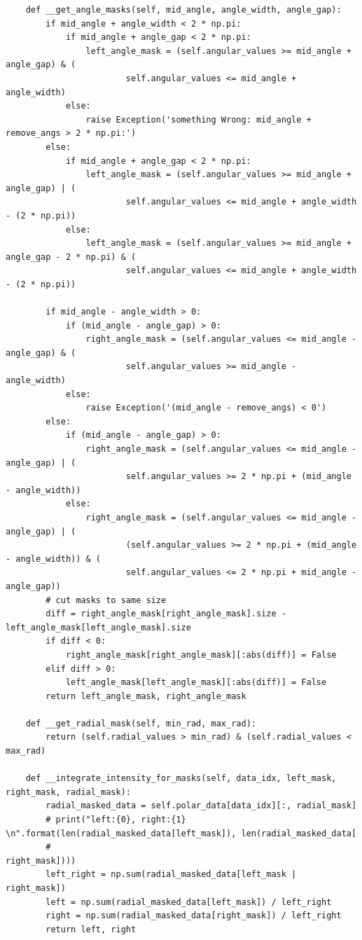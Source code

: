 \documentclass[a4paper, titlepage,  ngerman]{book}
\begin{document}
\begin{verbatim}
    def __get_angle_masks(self, mid_angle, angle_width, angle_gap):
        if mid_angle + angle_width < 2 * np.pi:
            if mid_angle + angle_gap < 2 * np.pi:
                left_angle_mask = (self.angular_values >= mid_angle + angle_gap) & (
                        self.angular_values <= mid_angle + angle_width)
            else:
                raise Exception('something Wrong: mid_angle + remove_angs > 2 * np.pi:')
        else:
            if mid_angle + angle_gap < 2 * np.pi:
                left_angle_mask = (self.angular_values >= mid_angle + angle_gap) | (
                        self.angular_values <= mid_angle + angle_width - (2 * np.pi))
            else:
                left_angle_mask = (self.angular_values >= mid_angle + angle_gap - 2 * np.pi) & (
                        self.angular_values <= mid_angle + angle_width - (2 * np.pi))

        if mid_angle - angle_width > 0:
            if (mid_angle - angle_gap) > 0:
                right_angle_mask = (self.angular_values <= mid_angle - angle_gap) & (
                        self.angular_values >= mid_angle - angle_width)
            else:
                raise Exception('(mid_angle - remove_angs) < 0')
        else:
            if (mid_angle - angle_gap) > 0:
                right_angle_mask = (self.angular_values <= mid_angle - angle_gap) | (
                        self.angular_values >= 2 * np.pi + (mid_angle - angle_width))
            else:
                right_angle_mask = (self.angular_values <= mid_angle - angle_gap) | (
                        (self.angular_values >= 2 * np.pi + (mid_angle - angle_width)) & (
                        self.angular_values <= 2 * np.pi + mid_angle - angle_gap))
        # cut masks to same size
        diff = right_angle_mask[right_angle_mask].size - left_angle_mask[left_angle_mask].size
        if diff < 0:
            right_angle_mask[right_angle_mask][:abs(diff)] = False
        elif diff > 0:
            left_angle_mask[left_angle_mask][:abs(diff)] = False
        return left_angle_mask, right_angle_mask

    def __get_radial_mask(self, min_rad, max_rad):
        return (self.radial_values > min_rad) & (self.radial_values < max_rad)

    def __integrate_intensity_for_masks(self, data_idx, left_mask, right_mask, radial_mask):
        radial_masked_data = self.polar_data[data_idx][:, radial_mask]
        # print("left:{0}, right:{1} \n".format(len(radial_masked_data[left_mask]), len(radial_masked_data[
        #                                                                                 right_mask])))
        left_right = np.sum(radial_masked_data[left_mask | right_mask])
        left = np.sum(radial_masked_data[left_mask]) / left_right
        right = np.sum(radial_masked_data[right_mask]) / left_right
        return left, right


\end{verbatim}
\end{document}
